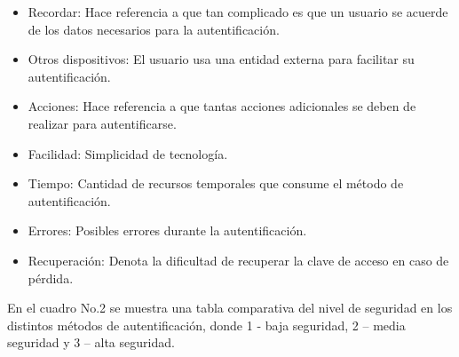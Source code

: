\documentclass[12pt, a4paper, titlepage]{report}
\begin{document}
		\begin{itemize}
			\item Recordar: Hace referencia a que tan complicado es que un usuario se acuerde de los datos necesarios para la autentificaci\'on. 
			\item Otros dispositivos: El usuario usa una entidad externa para facilitar su autentificaci\'on.
			\item Acciones: Hace referencia a que tantas acciones adicionales se deben de realizar para autentificarse.
			\item Facilidad: Simplicidad de tecnología.
			\item Tiempo: Cantidad de recursos temporales que consume el método de autentificaci\'on.
			\item Errores: Posibles errores durante la autentificaci\'on. 
			\item Recuperación: Denota la dificultad de recuperar la clave de acceso en caso de pérdida.
		\end{itemize}
		
		En el cuadro No.2 se muestra una tabla comparativa del nivel de seguridad en los distintos métodos de autentificaci\'on, donde 1 - baja seguridad, 2 – media seguridad y 3 – alta seguridad.
		
\end{document}
